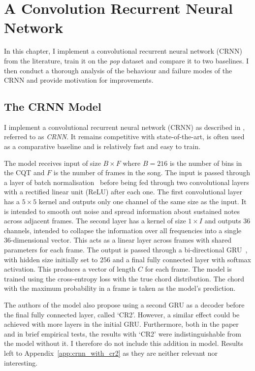 \chapter{A Convolution Recurrent Neural Network}\label{chap:crnn}

In this chapter, I implement a convolutional recurrent neural network (CRNN) from the literature, train it on the \emph{pop} dataset and compare it to two baselines. I then conduct a thorough analysis of the behaviour and failure modes of the CRNN and provide motivation for improvements. 

\section{The CRNN Model}\label{sec:crnn}

I implement a convolutional recurrent neural network (CRNN) as described in \citet{StructuredTraining}, referred to as \emph{CRNN}. It remains competitive with state-of-the-art, is often used as a comparative baseline and is relatively fast and easy to train.

The model receives input of size $B \times F$ where $B=216$ is the number of bins in the CQT and $F$ is the number of frames in the song. The input is passed through a layer of batch normalisation~\citep{BatchNorm} before being fed through two convolutional layers with a rectified linear unit (ReLU) after each one. The first convolutional layer has a $5\times 5$ kernel and outputs only one channel of the same size as the input. It is intended to smooth out noise and spread information about sustained notes across adjacent frames. The second layer has a kernel of size $1\times I$ and outputs 36 channels, intended to collapse the information over all frequencies into a single 36-dimensional vector. This acts as a linear layer across frames with shared parameters for each frame. The output is passed through a bi-directional GRU~\citep{GRU}, with hidden size initially set to $256$ and a final fully connected layer with softmax activation. This produces a vector of length $C$ for each frame. The model is trained using the cross-entropy loss with the true chord distribution. The chord with the maximum probability in a frame is taken as the model's prediction.

The authors of the model also propose using a second GRU as a decoder before the final fully connected layer, called `CR2'. However, a similar effect could be achieved with more layers in the initial GRU. Furthermore, both in the paper and in brief empirical tests, the results with `CR2' were indistinguishable from the model without it. I therefore do not include this addition in model. Results left to Appendix~\ref{app:crnn_with_cr2} as they are neither relevant nor interesting.

